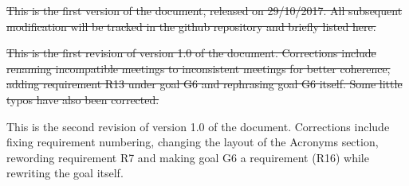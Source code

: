 \st{This is the first version of the document, released on 29/10/2017.
All subsequent modification will be tracked in the github repository and briefly listed here.}

\st{This is the first revision of version 1.0 of the document. Corrections include renaming incompatible meetings to inconsistent meetings for better coherence, adding requirement R13 under goal G6 and rephrasing goal G6 itself. Some little typos have also been corrected.}

This is the second revision of version 1.0 of the document. Corrections include fixing requirement numbering, changing the layout of the Acronyms section, rewording requirement R7 and making goal G6 a requirement (R16) while rewriting the goal itself.